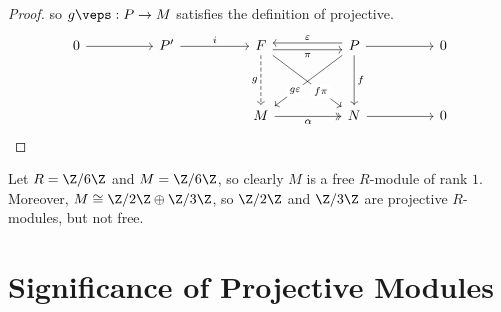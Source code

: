 \begin{proof}
so $g\veps :P \to M$ satisfies the definition of projective.
\[\begin{tikzcd}[ampersand replacement=\&]
	0 \&\& {P'} \&\& F \&\& P \&\& 0 \\
	\\
	\&\&\&\& M \&\& N \&\& 0
	\arrow[from=1-1, to=1-3]
	\arrow["i", from=1-3, to=1-5]
	\arrow["\pi"', shift right, from=1-5, to=1-7]
	\arrow["g"', dashed, from=1-5, to=3-5]
	\arrow["{f\pi}"{description, pos=0.7}, from=1-5, to=3-7]
	\arrow["\varepsilon"', shift right, from=1-7, to=1-5]
	\arrow[from=1-7, to=1-9]
	\arrow["{g\varepsilon}"{description, pos=0.7}, from=1-7, to=3-5]
	\arrow["f", from=1-7, to=3-7]
	\arrow["\alpha"', two heads, from=3-5, to=3-7]
	\arrow[from=3-7, to=3-9]
\end{tikzcd}\]
\end{proof}

\begin{ex}
    Let $R = \Z/6\Z$ and $M = \Z/6\Z$, so clearly $M$ is a free $R$-module of rank $1$. Moreover, $M \cong \Z/2\Z \oplus \Z/3\Z$, so $\Z/2\Z$ and $\Z/3\Z$ are projective $R$-modules, but not free.
\end{ex}

\section{Significance of Projective Modules}

